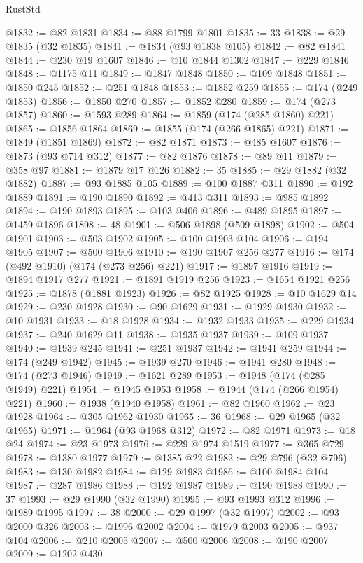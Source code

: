 \begin{lexlean}{RustStd}
\begin{coremodule}
{\begin{coremodule}
{{{{{{{{{{{{{{{{{{{{{{{{{{{{{{{{{{{{{{{{{{{{{{{{{{{{{{{@1832 := @82 @1831
@1834 := @88 @1799 @1801
@1835 := 33
@1838 := @29 @1835 (@32 @1835)
@1841 := @1834 (@93 @1838 @105)
@1842 := @82 @1841
@1844 := @230 @19 @1607
@1846 := @10 @1844 @1302
@1847 := @229 @1846
@1848 := @1175 @11
@1849 := @1847 @1848
@1850 := @109 @1848
@1851 := @1850 @245
@1852 := @251 @1848
@1853 := @1852 @259
@1855 := @174 (@249 @1853)
@1856 := @1850 @270
@1857 := @1852 @280
@1859 := @174 (@273 @1857)
@1860 := @1593 @289
@1864 := @1859 (@174 (@285 @1860) @221)
@1865 := @1856 @1864
@1869 := @1855 (@174 (@266 @1865) @221)
@1871 := @1849 (@1851 @1869)
@1872 := @82 @1871
@1873 := @485 @1607
@1876 := @1873 (@93 @714 @312)
@1877 := @82 @1876
@1878 := @89 @11
@1879 := @358 @97
@1881 := @1879 @17 @126
@1882 := 35
@1885 := @29 @1882 (@32 @1882)
@1887 := @93 @1885 @105
@1889 := @100 @1887 @311
@1890 := @192 @1889
@1891 := @190 @1890
@1892 := @413 @311
@1893 := @985 @1892
@1894 := @190 @1893
@1895 := @103 @406
@1896 := @489 @1895
@1897 := @1459 @1896
@1898 := 48
@1901 := @506 @1898 (@509 @1898)
@1902 := @504 @1901
@1903 := @503 @1902
@1905 := @100 @1903 @104
@1906 := @194 @1905
@1907 := @500 @1906
@1910 := @190 @1907 @256 @277
@1916 := @174 (@492 @1910) (@174 (@273 @256) @221)
@1917 := @1897 @1916
@1919 := @1894 @1917 @277
@1921 := @1891 @1919 @256
@1923 := @1654 @1921 @256
@1925 := @1878 (@1881 @1923)
@1926 := @82 @1925
@1928 := @10 @1629 @14
@1929 := @230 @1928
@1930 := @90 @1629
@1931 := @1929 @1930
@1932 := @10 @1931
@1933 := @18 @1928
@1934 := @1932 @1933
@1935 := @229 @1934
@1937 := @240 @1629 @11
@1938 := @1935 @1937
@1939 := @109 @1937
@1940 := @1939 @245
@1941 := @251 @1937
@1942 := @1941 @259
@1944 := @174 (@249 @1942)
@1945 := @1939 @270
@1946 := @1941 @280
@1948 := @174 (@273 @1946)
@1949 := @1621 @289
@1953 := @1948 (@174 (@285 @1949) @221)
@1954 := @1945 @1953
@1958 := @1944 (@174 (@266 @1954) @221)
@1960 := @1938 (@1940 @1958)
@1961 := @82 @1960
@1962 := @23 @1928
@1964 := @305 @1962 @1930
@1965 := 36
@1968 := @29 @1965 (@32 @1965)
@1971 := @1964 (@93 @1968 @312)
@1972 := @82 @1971
@1973 := @18 @24
@1974 := @23 @1973
@1976 := @229 @1974 @1519
@1977 := @365 @729
@1978 := @1380 @1977
@1979 := @1385 @22
@1982 := @29 @796 (@32 @796)
@1983 := @130 @1982
@1984 := @129 @1983
@1986 := @100 @1984 @104
@1987 := @287 @1986
@1988 := @192 @1987
@1989 := @190 @1988
@1990 := 37
@1993 := @29 @1990 (@32 @1990)
@1995 := @93 @1993 @312
@1996 := @1989 @1995
@1997 := 38
@2000 := @29 @1997 (@32 @1997)
@2002 := @93 @2000 @326
@2003 := @1996 @2002
@2004 := @1979 @2003
@2005 := @937 @104
@2006 := @210 @2005
@2007 := @500 @2006
@2008 := @190 @2007
@2009 := @1202 @430
}}}}}}}}}}}}}}}}}}}}}}}}}}}}}}}}}}}}}}}}}}}}}}}}}}}}}}}
\end{coremodule}}
\end{coremodule}
\end{lexlean}
